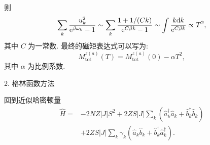 则
\begin{equation}
\sum_{k} \frac{u^2_{k}}{\mathrm{e}^{\beta \omega_{k}}-1} \sim \sum_{k} \frac{1+1 /(C k)}{\mathrm{e}^{C \beta k}-1} \sim \int \frac{k \mathrm{d} k}{\mathrm{e}^{C\beta k}} \propto T^{2},
\end{equation}
其中 $C$ 为一常数. 最终的磁矩表达式可以写为:
\begin{equation}
M_{\mathrm{tot}}^{z(a)}(T)=M_{\mathrm{tot}}^{z(a)}(0)-\alpha T^{2},
\end{equation}
其中 $\alpha$ 为比例系数.


2. 格林函数方法

回到近似哈密顿量
\begin{align}
\hat{H}=&-2 N Z|J| S^{2}+2 Z S|J| \sum_{k}\left(\hat{a}_{k}^{\dagger} \hat{a}^{}_{k}+\hat{b}_{k}^{\dagger} \hat{b}^{}_{k}\right) \nonumber\\
&+2 Z S|J| \sum_{k} \gamma_{k}\left(\hat{a}_{k} \hat{b}_{k}+\hat{b}_{k}^{\dagger} \hat{a}_{k}^{\dagger}\right) .
\end{align}

